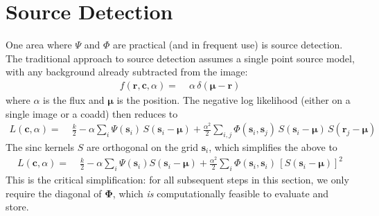 \documentclass[10pt]{article}
\begin{document}
\section{Source Detection}
\label{sec:detection}

One area where $\Psi$ and $\Phi$ are practical (and in frequent use) is source detection.  The traditional approach to source detection assumes a single point source model, with any background already subtracted from the image:
\begin{align}
f(\bm{r},\bm{c},\alpha) =\;& \alpha\,\delta(\bm{\mu}-\bm{r})
\end{align}
where $\alpha$ is the flux and $\bm{\mu}$ is the position.  The negative log likelihood (either on a single image or a coadd) then reduces to
\begin{align}
L(\bm{c},\alpha) =\;& \frac{k}{2}
        - \alpha \sum_i \Psi(\bm{s}_i)\,S(\bm{s}_i-\bm{\mu})
        + \frac{\alpha^2}{2} \sum_{i,j}
            \Phi(\bm{s}_i,\bm{s}_j)\,S(\bm{s}_i-\bm{\mu})
                \,S(\bm{r}_j - \bm{\mu})
\end{align}
The sinc kernels $S$ are orthogonal on the grid $\bm{s}_i$, which simplifies the above to
\begin{align}
L(\bm{c},\alpha) =\;& \frac{k}{2}
        - \alpha \sum_i \Psi(\bm{s}_i) S(\bm{s}_i-\bm{\mu})
        + \frac{\alpha^2}{2} \sum_{i}
            \Phi(\bm{s}_i,\bm{s}_i)\,\left[S(\bm{s}_i-\bm{\mu})\right]^2
\end{align}
This is the critical simplification: for all subsequent steps in this section, we only require the diagonal of $\bm{\Phi}$, which \emph{is} computationally feasible to evaluate and store.
\end{document}
